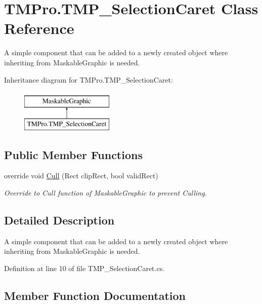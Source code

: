 \hypertarget{class_t_m_pro_1_1_t_m_p___selection_caret}{}\section{T\+M\+Pro.\+T\+M\+P\+\_\+\+Selection\+Caret Class Reference}
\label{class_t_m_pro_1_1_t_m_p___selection_caret}


A simple component that can be added to a newly created object where inheriting from Maskable\+Graphic is needed.  


Inheritance diagram for T\+M\+Pro.\+T\+M\+P\+\_\+\+Selection\+Caret\+:\begin{figure}[H]
\begin{center}
\leavevmode
\includegraphics[height=2.000000cm]{class_t_m_pro_1_1_t_m_p___selection_caret}
\end{center}
\end{figure}
\subsection*{Public Member Functions}
\begin{DoxyCompactItemize}
\item 
override void \mbox{\hyperlink{class_t_m_pro_1_1_t_m_p___selection_caret_af1c9301ab3bdef26d4d2fda8b3d77ab2}{Cull}} (Rect clip\+Rect, bool valid\+Rect)
\begin{DoxyCompactList}\small\item\em Override to Cull function of Maskable\+Graphic to prevent Culling. \end{DoxyCompactList}\end{DoxyCompactItemize}


\subsection{Detailed Description}
A simple component that can be added to a newly created object where inheriting from Maskable\+Graphic is needed. 



Definition at line 10 of file T\+M\+P\+\_\+\+Selection\+Caret.\+cs.



\subsection{Member Function Documentation}
\mbox{\label{class_t_m_pro_1_1_t_m_p___selection_caret_af1c9301ab3bdef26d4d2fda8b3d77ab2}} 
